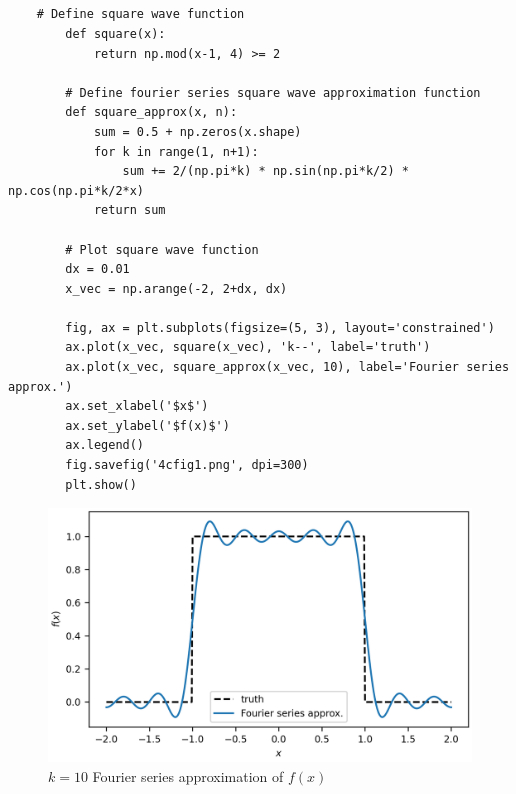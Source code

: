 \documentclass[11pt]{article}
\begin{document}
\subsection{} %
\begin{listing}[H]
    \caption{Python code to generate Figure \ref{4cfig1}}
    \label{4clst1}
    \begin{verbatim}
    # Define square wave function
        def square(x):
            return np.mod(x-1, 4) >= 2

        # Define fourier series square wave approximation function
        def square_approx(x, n):
            sum = 0.5 + np.zeros(x.shape)
            for k in range(1, n+1):
                sum += 2/(np.pi*k) * np.sin(np.pi*k/2) * np.cos(np.pi*k/2*x)
            return sum

        # Plot square wave function
        dx = 0.01
        x_vec = np.arange(-2, 2+dx, dx)

        fig, ax = plt.subplots(figsize=(5, 3), layout='constrained')
        ax.plot(x_vec, square(x_vec), 'k--', label='truth')
        ax.plot(x_vec, square_approx(x_vec, 10), label='Fourier series approx.')
        ax.set_xlabel('$x$')
        ax.set_ylabel('$f(x)$')
        ax.legend()
        fig.savefig('4cfig1.png', dpi=300)
        plt.show()
    \end{verbatim}
\end{listing}

\begin{figure}[H]
    \centering
    \includegraphics[width=5in]{4cfig1.png}
    \caption{$k=10$ Fourier series approximation of $f(x)$}
    \label{4cfig1}
\end{figure}
\end{document}

